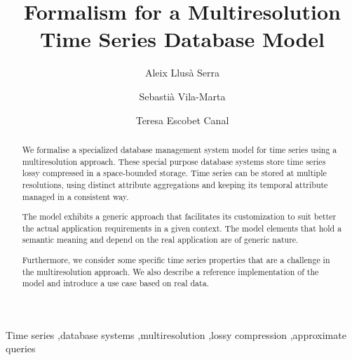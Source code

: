 \documentclass[
  preprint,
  review,
  twocolumn,
  5p,
  sort&compress,
]{elsarticle}
\begin{document}


\begin{frontmatter}

  \title{Formalism for a Multiresolution Time Series Database Model}


  \author
  [dipse]
  {Aleix Llus\`{a} Serra}

  \author
  [dipse]
  {Sebasti\`{a} Vila-Marta
  }

  \author
  [dipse]
  {Teresa Escobet Canal
  }



  \address
  [dipse]
  {Department of Electronic System Design and Programming\\ Universitat Polit\`{e}cnica de Catalunya\\ Av.~Bases de Manresa 61--73, 08242 Manresa, ES-CT}



  \begin{abstract}
    We formalise a specialized database management system model for
    time series using a multiresolution approach. These special
    purpose database systems store time series lossy compressed in a
    space-bounded storage. Time series can be stored at multiple
    resolutions, using distinct attribute aggregations and keeping its
    temporal attribute managed in a consistent way.
   
    The model exhibits a generic approach that facilitates its
    customization to suit better the actual application requirements
    in a given context. The model elements that hold a semantic
    meaning and depend on the real application are of generic nature.

    Furthermore, we consider some specific time series properties that
    are a challenge in the multiresolution approach. We also describe
    a reference implementation of the model and introduce a use case
    based on real data.
  \end{abstract}


  \begin{keyword}
    Time series \sep database systems \sep multiresolution \sep lossy
    compression \sep approximate queries
  \end{keyword}

\end{frontmatter}
\end{document}
